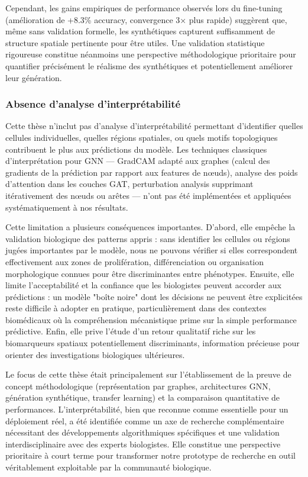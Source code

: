 Cependant, les gains empiriques de performance observés lors du fine-tuning (amélioration de +8.3\% accuracy, convergence 3× plus rapide) suggèrent que, même sans validation formelle, les synthétiques capturent suffisamment de structure spatiale pertinente pour être utiles. Une validation statistique rigoureuse constitue néanmoins une perspective méthodologique prioritaire pour quantifier précisément le réalisme des synthétiques et potentiellement améliorer leur génération.

\subsubsection{Absence d'analyse d'interprétabilité}

Cette thèse n'inclut pas d'analyse d'interprétabilité permettant d'identifier quelles cellules individuelles, quelles régions spatiales, ou quels motifs topologiques contribuent le plus aux prédictions du modèle. Les techniques classiques d'interprétation pour GNN — GradCAM adapté aux graphes (calcul des gradients de la prédiction par rapport aux features de nœuds), analyse des poids d'attention dans les couches GAT, perturbation analysis supprimant itérativement des nœuds ou arêtes — n'ont pas été implémentées et appliquées systématiquement à nos résultats.

Cette limitation a plusieurs conséquences importantes. D'abord, elle empêche la validation biologique des patterns appris : sans identifier les cellules ou régions jugées importantes par le modèle, nous ne pouvons vérifier si elles correspondent effectivement aux zones de prolifération, différenciation ou organisation morphologique connues pour être discriminantes entre phénotypes. Ensuite, elle limite l'acceptabilité et la confiance que les biologistes peuvent accorder aux prédictions : un modèle "boîte noire" dont les décisions ne peuvent être explicitées reste difficile à adopter en pratique, particulièrement dans des contextes biomédicaux où la compréhension mécanistique prime sur la simple performance prédictive. Enfin, elle prive l'étude d'un retour qualitatif riche sur les biomarqueurs spatiaux potentiellement discriminants, information précieuse pour orienter des investigations biologiques ultérieures.

Le focus de cette thèse était principalement sur l'établissement de la preuve de concept méthodologique (représentation par graphes, architectures GNN, génération synthétique, transfer learning) et la comparaison quantitative de performances. L'interprétabilité, bien que reconnue comme essentielle pour un déploiement réel, a été identifiée comme un axe de recherche complémentaire nécessitant des développements algorithmiques spécifiques et une validation interdisciplinaire avec des experts biologistes. Elle constitue une perspective prioritaire à court terme pour transformer notre prototype de recherche en outil véritablement exploitable par la communauté biologique.

